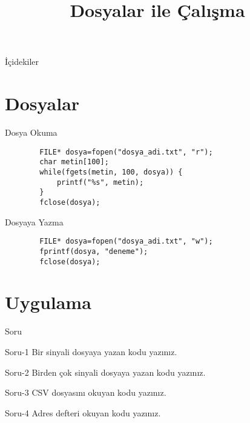 
\title[Ders 8] {Dosyalar ile Çalışma}

\frame{\titlepage}
\begin{frame}[fragile]{İçidekiler}
    \tableofcontents
\end{frame}
\section{Dosyalar}
\begin{frame}[fragile]{Dosya Okuma}
    \begin{lstlisting}
        FILE* dosya=fopen("dosya_adi.txt", "r");
        char metin[100];
        while(fgets(metin, 100, dosya)) {
            printf("%s", metin);
        }
        fclose(dosya);\end{lstlisting}
\end{frame}
\begin{frame}[fragile]{Dosyaya Yazma}
    \begin{lstlisting}
        FILE* dosya=fopen("dosya_adi.txt", "w");
        fprintf(dosya, "deneme");
        fclose(dosya);\end{lstlisting}
\end{frame}
\section{Uygulama}
\begin{frame}[fragile]{Soru}
    \begin{alertblock}{Soru-1}
        Bir sinyali dosyaya yazan kodu yazınız.
    \end{alertblock}
    \begin{alertblock}{Soru-2}
        Birden çok sinyali dosyaya yazan kodu yazınız.
    \end{alertblock}
    \begin{alertblock}{Soru-3}
        CSV dosyasını okuyan kodu yazınız.
    \end{alertblock}
    \begin{alertblock}{Soru-4}
        Adres defteri okuyan kodu yazınız.
    \end{alertblock}
\end{frame}
